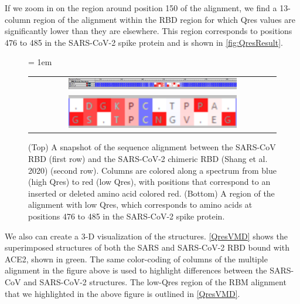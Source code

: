 {{If we zoom in on the region around position 150 of the alignment, we find a 13-column region of the alignment within the RBD region for which Qres values are significantly lower than they are elsewhere. This region corresponds to positions 476 to 485 in the SARS-CoV-2 spike protein and is shown in \autoref{fig:QresResult}.

\begin{figure}[h]
	\centering
	\tabcolsep = 1em
	\mySfFamily
	\begin{tabular}{c}
		\includegraphics[width = 0.7\textwidth]{../images/QresResult.png} \\
		\includegraphics[width = 0.7\textwidth]{../images/QresResult_cropped.png} \\
	\end{tabular}
	\caption{(Top) A snapshot of the sequence alignment between the SARS-CoV RBD (first row) and the SARS-CoV-2 chimeric RBD (Shang et al. 2020) (second row). Columns are colored along a spectrum from blue (high Qres) to red (low Qres), with positions that correspond to an inserted or deleted amino acid colored red. (Bottom) A region of the alignment with low Qres, which corresponds to amino acids at positions 476 to 485 in the SARS-CoV-2 spike protein.}
	\label{fig:QresResult}
\end{figure}

We also can create a 3-D visualization of the structures. \autoref{QresVMD} shows the superimposed structures of both the SARS and SARS-CoV-2 RBD bound with ACE2, shown in green. The same color-coding of columns of the multiple alignment in the figure above is used to highlight differences between the SARS-CoV and SARS-CoV-2 structures. The low-Qres region of the RBM alignment that we highlighted in the above figure is outlined in \autoref{QresVMD}.

}}
